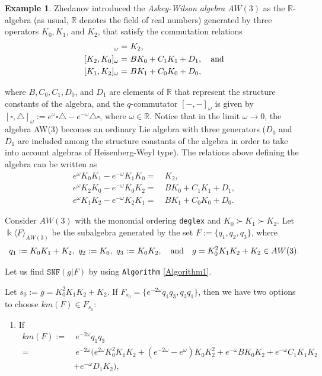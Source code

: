 \documentclass{amsart}
\theoremstyle{definition}
\newtheorem{example}[theorem]{Example}
\theoremstyle{remark}
\numberwithin{equation}{section}
\begin{document}
\begin{example}
Zhedanov \cite[Section 1]{Zhedanov1991} introduced the {\em Askey-Wilson algebra} $AW(3)$ as the $\mathbb{R}$-algebra (as usual, $\mathbb{R}$ denotes the field of real numbers) generated by three operators $K_0, K_1$, and $K_2$, that satisfy the commutation relations 
\begin{align*}
	[K_0, K_1]_{\omega} = &\ K_2, \\
	[K_2, K_0]_{\omega} = &\ BK_0 + C_1K_1 + D_1, \quad {\rm and}\\
	[K_1, K_2]_{\omega} = &\ BK_1 + C_0K_0 + D_0,
\end{align*}

where $B, C_0, C_1, D_0$, and $D_1$ are elements of $\mathbb{R}$ that represent the structure constants of the algebra, and the $q$-commutator $[ - , -]_{\omega}$ is given by $[\square, \triangle]_{\omega}:= e^{\omega}\square \triangle - e^{- \omega}\triangle \square$, where $\omega\in \mathbb{R}$. Notice that in the limit $\omega \to 0$, the algebra AW(3) becomes an ordinary Lie algebra with three generators ($D_0$ and $D_1$ are included among the structure constants of the algebra in order to take into account algebras of Heisenberg-Weyl type). The relations above defining the algebra can be written as 
\begin{align*}
    e^{\omega}K_0K_1 - e^{-\omega}K_1K_0 = &\ K_2,\\
    e^{\omega} K_2K_0 - e^{-\omega}K_0 K_2 = &\ BK_0 + C_1K_1 + D_1,\\
    e^{\omega}K_1K_2 - e^{-\omega}K_2K_1 = &\ BK_1 + C_0K_0 + D_0.
\end{align*}

Consider $AW(3)$  with the monomial ordering \texttt{deglex} and $K_0\succ K_1\succ K_2.$ Let $\Bbbk\langle F\rangle_{AW(3)}$ be the subalgebra generated by the set $F:=\{q_1, q_2, q_3\}$, where 
$$
q_1:=K_0 K_1+K_2,\ q_2:= K_0,\ q_3:= K_0 K_2, \quad {\rm and} \quad g =K_0^2 K_1 K_2+K_2\in AW(3).
$$

Let us find $\texttt{SNF}(g | F)$ by using \texttt{Algorithm} \ref{Algorithm1}. 

Let $s_0 := g = K_0^2 K_1 K_2+K_2$. If $F_{s_0}=\{e^{-2\omega}q_1q_3,q_3q_1\}$, then we have two options to choose $km(F) \in F_{s_0}$:
\begin{enumerate}
\item [\rm (i)] If
\begin{align*}
km(F):= &\ e^{-2\omega}q_1q_3 \\
= &\ e^{-2\omega}(e^{2 \omega} K_0^2 K_1 K_2+\left(e^{-2 \omega} - e^\omega\right) K_0 K_2^2+e^{-\omega} B K_0 K_2+e^{-\omega} C_1 K_1 K_2\\
 &+e^{-\omega} D_1 K_2),
\end{align*}


\end{enumerate}
\end{example}
\end{document}

